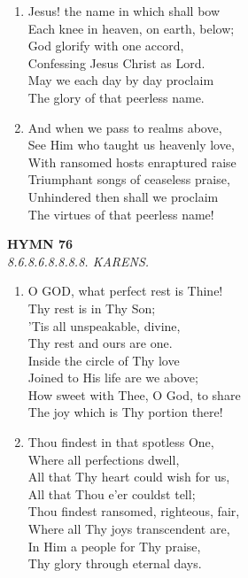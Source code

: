 \begin{enumerate}
    \item Jesus! the name in which shall bow \\
        Each knee in heaven, on earth, below; \\
        God glorify with one accord, \\
        Confessing Jesus Christ as Lord. \\
        May we each day by day proclaim \\
        The glory of that peerless name.

    \item And when we pass to realms above, \\
        See Him who taught us heavenly love, \\
        With ransomed hosts enraptured raise \\
        Triumphant songs of ceaseless praise, \\
        Unhindered then shall we proclaim \\
        The virtues of that peerless name!

\end{enumerate}

\newpage
\begin{center}
    {\Large \textbf{HYMN 76}}
    \\
    \textit{8.6.8.6.8.8.8.8. KARENS.}
\end{center}
\vspace{1em}

\begin{enumerate}
    \item O GOD, what perfect rest is Thine! \\
        Thy rest is in Thy Son; \\
        'Tis all unspeakable, divine, \\
        Thy rest and ours are one. \\
        Inside the circle of Thy love \\
        Joined to His life are we above; \\
        How sweet with Thee, O God, to share \\
        The joy which is Thy portion there!

    \item Thou findest in that spotless One, \\
        Where all perfections dwell, \\
        All that Thy heart could wish for us, \\
        All that Thou e'er couldst tell; \\
        Thou findest ransomed, righteous, fair, \\
        Where all Thy joys transcendent are, \\
        In Him a people for Thy praise, \\
        Thy glory through eternal days.

\end{enumerate}

